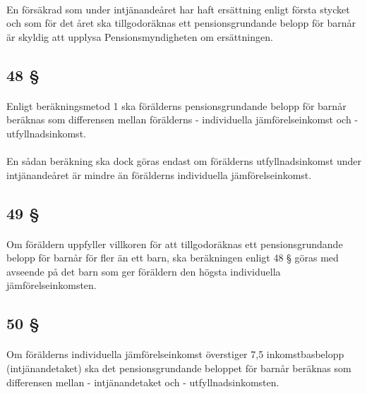 \documentclass[a4paper,notitlepage,openany,10pt]{book}
\begin{document}
\paragraph*{}
En försäkrad som under intjänandeåret har haft ersättning enligt första stycket och som för det året ska tillgodoräknas ett pensionsgrundande belopp för barnår är skyldig att upplysa Pensionsmyndigheten om ersättningen.
\subsection*{48 §}
\paragraph*{}
Enligt beräkningsmetod 1 ska förälderns pensionsgrundande belopp för barnår beräknas som differensen mellan förälderns
\newline - individuella jämförelseinkomst och
\newline - utfyllnadsinkomst.
\paragraph*{}
En sådan beräkning ska dock göras endast om förälderns utfyllnadsinkomst under intjänandeåret är mindre än förälderns individuella jämförelseinkomst.
\subsection*{49 §}
\paragraph*{}
Om föräldern uppfyller villkoren för att tillgodoräknas ett pensionsgrundande belopp för barnår för fler än ett barn, ska beräkningen enligt 48 § göras med avseende på det barn som ger föräldern den högsta individuella jämförelseinkomsten.
\subsection*{50 §}
\paragraph*{}
Om förälderns individuella jämförelseinkomst överstiger 7,5 inkomstbasbelopp (intjänandetaket) ska det pensionsgrundande beloppet för barnår beräknas som differensen mellan
\newline - intjänandetaket och
\newline - utfyllnadsinkomsten.
\end{document}

